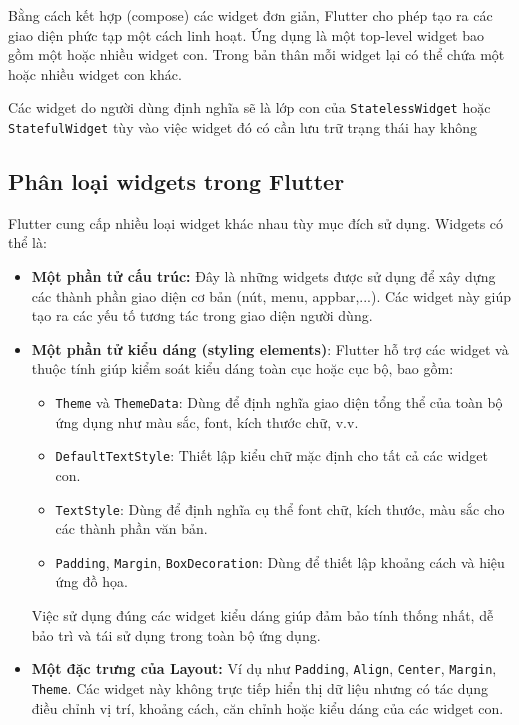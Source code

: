 \documentclass[../DoAn.tex]{subfiles}
\numberwithin{figure}{chapter}
\begin{document}
Bằng cách kết hợp (compose) các widget đơn giản, Flutter cho phép tạo ra các giao diện phức tạp một cách linh hoạt. Ứng dụng là một top-level widget bao gồm một hoặc nhiều widget con. Trong bản thân mỗi widget lại có thể chứa một hoặc nhiều widget con khác.

Các widget do người dùng định nghĩa sẽ là lớp con của \texttt{StatelessWidget} hoặc \texttt{StatefulWidget} tùy vào việc widget đó có cần lưu trữ trạng thái hay không

\subsection{Phân loại widgets trong Flutter}
Flutter cung cấp nhiều loại widget khác nhau tùy mục đích sử dụng. Widgets có thể là:
\begin{itemize}
\item \textbf{Một phần tử cấu trúc:} Đây là những widgets được sử dụng để xây dựng các thành phần giao diện cơ bản (nút, menu, appbar,...). Các widget này giúp tạo ra các yếu tố tương tác trong giao diện người dùng.
\item \textbf{Một phần tử kiểu dáng (styling elements)}: 
    Flutter hỗ trợ các widget và thuộc tính giúp kiểm soát kiểu dáng toàn cục hoặc cục bộ, bao gồm:
    \begin{itemize}
        \item \texttt{Theme} và \texttt{ThemeData}: Dùng để định nghĩa giao diện tổng thể của toàn bộ ứng dụng như màu sắc, font, kích thước chữ, v.v.
        \item \texttt{DefaultTextStyle}: Thiết lập kiểu chữ mặc định cho tất cả các widget con.
        \item \texttt{TextStyle}: Dùng để định nghĩa cụ thể font chữ, kích thước, màu sắc cho các thành phần văn bản.
        \item \texttt{Padding}, \texttt{Margin}, \texttt{BoxDecoration}: Dùng để thiết lập khoảng cách và hiệu ứng đồ họa.
    \end{itemize}
    Việc sử dụng đúng các widget kiểu dáng giúp đảm bảo tính thống nhất, dễ bảo trì và tái sử dụng trong toàn bộ ứng dụng.
\item \textbf{Một đặc trưng của Layout:} Ví dụ như \texttt{Padding}, \texttt{Align}, \texttt{Center}, \texttt{Margin}, \texttt{Theme}. Các widget này không trực tiếp hiển thị dữ liệu nhưng có tác dụng điều chỉnh vị trí, khoảng cách, căn chỉnh hoặc kiểu dáng của các widget con. 
\end{itemize}
\end{document}
